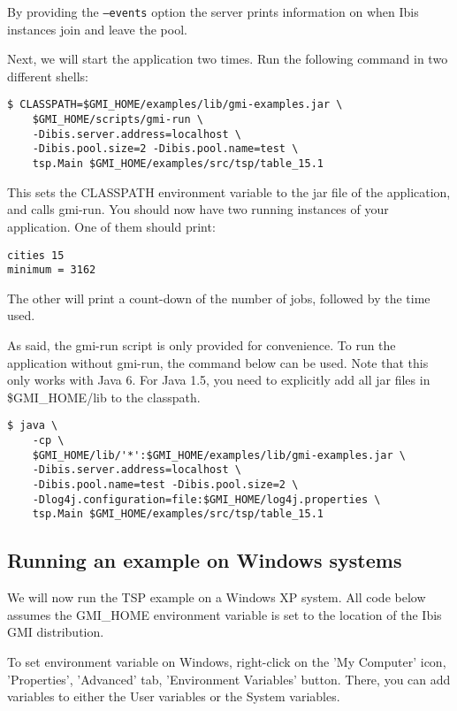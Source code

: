 \documentclass[a4paper,10pt]{article}
\begin{document}
By providing the \texttt{--events} option the server
prints information on when Ibis instances join and leave the pool.

Next, we will start the application two times.
Run the following command in two different shells:

\noindent
{\small
\begin{verbatim}
$ CLASSPATH=$GMI_HOME/examples/lib/gmi-examples.jar \
    $GMI_HOME/scripts/gmi-run \
    -Dibis.server.address=localhost \
    -Dibis.pool.size=2 -Dibis.pool.name=test \
    tsp.Main $GMI_HOME/examples/src/tsp/table_15.1
\end{verbatim}
}
\noindent

This sets the CLASSPATH environment variable to the jar file of the
application, and calls gmi-run. You should now have two running
instances of your application. One of them should print:

\noindent
{\small
\begin{verbatim}
cities 15
minimum = 3162
\end{verbatim}
}
\noindent

The other will print a count-down of the number of jobs, followed by the
time used.

As said, the gmi-run script is only provided for convenience. To run
the application without gmi-run, the command below can be used.
Note that this only works with Java 6. For Java 1.5, you need to
explicitly add all jar files in \$GMI\_HOME/lib to the classpath.

\noindent
{\small
\begin{verbatim}
$ java \
    -cp \
    $GMI_HOME/lib/'*':$GMI_HOME/examples/lib/gmi-examples.jar \
    -Dibis.server.address=localhost \
    -Dibis.pool.name=test -Dibis.pool.size=2 \
    -Dlog4j.configuration=file:$GMI_HOME/log4j.properties \
    tsp.Main $GMI_HOME/examples/src/tsp/table_15.1
\end{verbatim}
}
\noindent

\subsection{Running an example on Windows systems}

We will now run the TSP example on a Windows XP system.
All code below assumes the GMI\_HOME
environment variable is set to the location of the Ibis GMI distribution.

To set environment variable on Windows, right-click on the 'My Computer' icon,
'Properties', 'Advanced' tab, 'Environment Variables' button. There, you
can add variables to either the User variables or the System variables.
\end{document}
